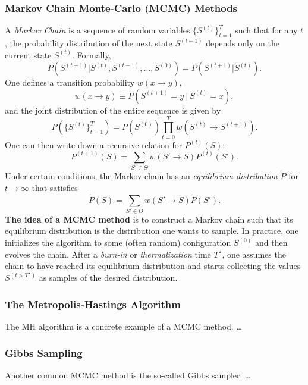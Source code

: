 \documentclass{article}
\begin{document}
\subsubsection*{Markov Chain Monte-Carlo (MCMC) Methods}
A \emph{Markov Chain} is a sequence of random variables $\{S^{(t)}\}_{t=1}^T$ such that for any $t$, the probability distribution of the next state $S^{(t+1)}$ depends only on the current state $S^{(t)}$. Formally,
\begin{equation}
    P(S^{(t+1)} | S^{(t)}, S^{(t-1)}, \dots,S^{(0)})
    =
    P(S^{(t+1)} | S^{(t)}).
\end{equation}
One defines a transition probability $w(x\rightarrow y)$,
\begin{equation}
    w(x\rightarrow y) \equiv P(S^{(t+1)} =y\ |\ S^{(t)}=x),
\end{equation}
and the joint distribution of the entire sequence is given by
\begin{equation}
    P\left(\{S^{(t)}\}_{t=1}^T\right)
    =
    P(S^{(0)}) \prod_{t=0}^{T}
    w(S^{(t)}\rightarrow S^{(t+1)}).
\end{equation}
One can then write down a recursive relation for $P^{(t)}(S)$:
\begin{equation}
    P^{(t+1)}(S)
    =
    \sum_{S' \in \Theta} w(S'\rightarrow S) P^{(t)}(S').
\end{equation}
Under certain conditions, the Markov chain has an \emph{equilibrium distribution} $\tilde{P}$ for $t\rightarrow\infty$ that satisfies
\begin{equation}
    \tilde{P}(S)
    =
    \sum_{S' \in \Theta} w(S'\rightarrow S) \tilde{P}(S').
\end{equation}
\textbf{The idea of a MCMC method} is to construct a Markov chain such that its equilibrium distribution is the distribution one wants to sample. In practice, one initializes the algorithm to some (often random) configuration $S^{(0)}$ and then evolves the chain. After a \emph{burn-in} or \emph{thermalization} time $T^{\star}$, one assumes the chain to have reached its equilibrium distribution and starts collecting the values $S^{(t>T^{\star})}$ as samples of the desired distribution.
\subsubsection*{The Metropolis-Hastings Algorithm}
The MH algorithm is a concrete example of a MCMC method. \dots
\subsubsection*{Gibbs Sampling}
Another common MCMC method is the so-called Gibbs sampler. \dots
\end{document}
